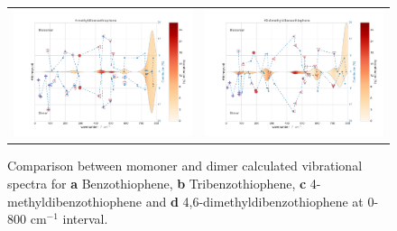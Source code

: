 \begin{figure}[H]
\begin{center}
{\begin{tabular}{c c}
						\includegraphics[scale=0.3]{image/P2-16c} & \includegraphics[scale=0.3]{image/P2-16d}\\
					\end{tabular}}
				\end{center}
				\caption{Comparison between momoner and dimer calculated vibrational spectra for \textbf{a} Benzothiophene, \textbf{b} Tribenzothiophene, \textbf{c} 4-methyldibenzothiophene and \textbf{d} 4,6-dimethyldibenzothiophene at 0- 800 cm$^{-1}$ interval.}  \label{figP2-16ad}
			\end{figure}
	

